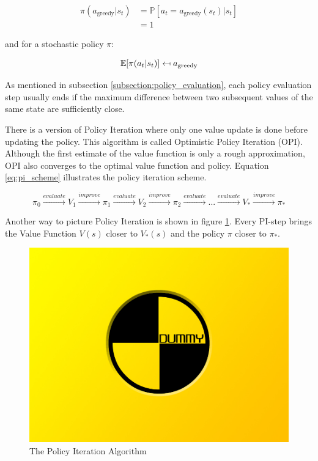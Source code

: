 \begin{align}
\pi(a_{\text{greedy}}|s_t)&=\mathbb{P}[a_t=a_{\text{greedy}}(s_t)|s_t] \\ &=1
\end{align}

and for a stochastic policy $\pi$:

\begin{equation}
\mathbb{E}[\pi(a_t | s_t)] \mathrel{\reflectbox{\ensuremath{\mapsto}}} a_{\text{greedy}}
\end{equation}

As mentioned in subsection \ref{subsection:policy_evaluation}, each policy evaluation step usually ends if the maximum difference between two subsequent values of the same state are sufficiently close.

There is a version of Policy Iteration where only one value update is done before updating the policy. This algorithm is called Optimistic Policy Iteration (OPI). Although the first estimate of the value function is only a rough approximation, OPI also converges to the optimal value function and policy. Equation \ref{eq:pi_scheme} illustrates the policy iteration scheme.

\begin{equation*}
\pi_0 \overset{evaluate}{\longrightarrow} V_1 \overset{improve}{\longrightarrow} \pi_1 \overset{evaluate}{\longrightarrow} V_2 \overset{improve}{\longrightarrow} \pi_2 \overset{evaluate}{\longrightarrow} ... \overset{evaluate}{\longrightarrow} V_* \overset{improve}{\longrightarrow} \pi_*
\label{eq:pi_scheme}
\end{equation*}

Another way to picture Policy Iteration is shown in figure \ref{fig:PI_triangle}. Every PI-step brings the Value Function $V(s)$ closer to $V_*(s)$ and the policy $\pi$ closer to $\pi_*$.

\begin{figure}[h]
	\includegraphics[width=\textwidth]{src/pics/dummy.jpg}
	\caption{The Policy Iteration Algorithm}
	\label{fig:PI_triangle} 
\end{figure}


